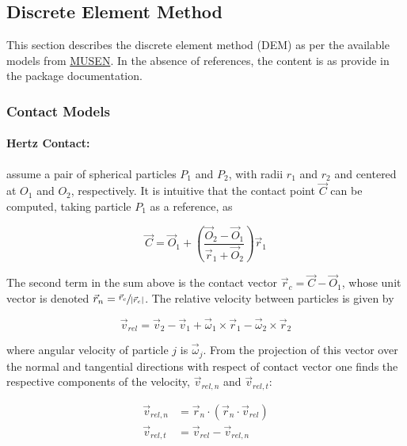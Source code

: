 \subsection{Discrete Element Method}

This section describes the discrete element method (DEM) as per the available models from \href{https://github.com/msolids/musen}{MUSEN}. In the absence of references, the content is as provide in the package documentation.

\subsubsection{Contact Models}

\paragraph{Hertz Contact:} assume a pair of spherical particles $P_{1}$ and $P_{2}$, with radii $r_{1}$ and $r_{2}$ and centered at $O_{1}$ and $O_{2}$, respectively. It is intuitive that the contact point $\vec{C}$ can be computed, taking particle $P_{1}$ as a reference, as

\begin{equation}
\vec{C} = \vec{O}_{1} + \left(\dfrac{\vec{O}_{2} - \vec{O}_{1}}{\vec{r}_{1} + \vec{O}_{2}}\right)\vec{r}_{1}
\end{equation}

The second term in the sum above is the contact vector $\vec{r}_{c}=\vec{C} - \vec{O}_{1}$, whose unit vector is denoted $\vec{r}_{n}=\sfrac{\vec{r}_{c}}{\vert\vec{r}_{c}\vert}$. The relative velocity between particles is given by

\begin{equation}
\vec{v}_{rel} = \vec{v}_{2} - \vec{v}_{1} + \vec{\omega}_{1}\times\vec{r}_{1} - \vec{\omega}_{2}\times\vec{r}_{2}
\end{equation}

\noindent{}where angular velocity of particle $j$ is $\vec{\omega}_{j}$. From the projection of this vector over the normal and tangential directions with respect of contact vector one finds the respective components of the velocity, $\vec{v}_{rel,n}$ and $\vec{v}_{rel,t}$:

\begin{equation}
\begin{aligned}
\vec{v}_{rel,n} &= \vec{r}_n\cdotp\left(\vec{r}_n\cdotp\vec{v}_{rel}\right)\\[6pt]
\vec{v}_{rel,t} &= \vec{v}_{rel} - \vec{v}_{rel,n}
\end{aligned}
\end{equation}

